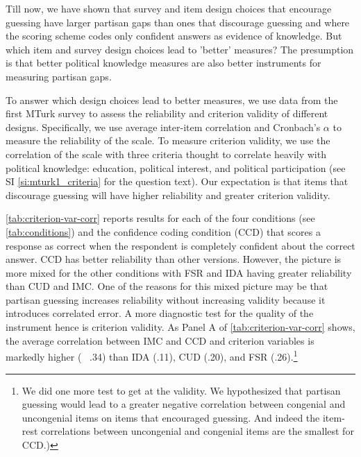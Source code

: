 \documentclass[12pt, letterpaper]{article}
\begin{document}
Till now, we have shown that survey and item design choices that encourage guessing have larger partisan gaps than ones that discourage guessing and where the scoring scheme codes only confident answers as evidence of knowledge. But which item and survey design choices lead to 'better' measures? The presumption is that better political knowledge measures are also better instruments for measuring partisan gaps. 

To answer which design choices lead to better measures, we use data from the first MTurk survey to assess the reliability and criterion validity of different designs. Specifically, we use average inter-item correlation and Cronbach's $\alpha$ to measure the reliability of the scale. To measure criterion validity, we use the correlation of the scale with three criteria thought to correlate heavily with political knowledge: education, political interest, and political participation (see SI \ref{si:mturk1_criteria} for the question text). Our expectation is that items that discourage guessing will have higher reliability and greater criterion validity. 

\cref{tab:criterion-var-corr} reports results for each of the four conditions (see \cref{tab:conditions}) and the confidence coding condition (CCD) that scores a response as correct when the respondent is completely confident about the correct answer. CCD has better reliability than other versions. However, the picture is more mixed for the other conditions with FSR and IDA having greater reliability than CUD and IMC. One of the reasons for this mixed picture may be that partisan guessing increases reliability without increasing validity because it introduces correlated error. A more diagnostic test for the quality of the instrument hence is criterion validity. As Panel A of \cref{tab:criterion-var-corr} shows, the average correlation between IMC and CCD and criterion variables is markedly higher (~ .34) than IDA (.11), CUD (.20), and FSR (.26).\footnote{We did one more test to get at the validity. We hypothesized that partisan guessing would lead to a greater negative correlation between congenial and uncongenial items on items that encouraged guessing. And indeed the item-rest correlations between uncongenial and congenial items are the smallest for CCD.)}
\end{document}
